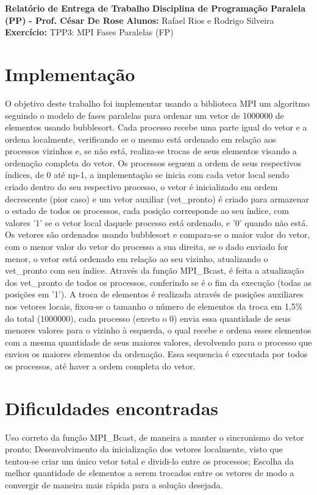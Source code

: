 \documentclass{article}
\begin{document}
\textbf{Relatório de Entrega de Trabalho} \newline
\textbf{Disciplina de Programação Paralela (PP)}\textbf{ - Prof. César De Rose} \newline
\textbf{Alunos:} Rafael Rios e Rodrigo Silveira \newline
\textbf{Exercício:} TPP3: MPI Fases Paralelas (FP)

\begin{multicols*}{2}

\section{Implementação}
O objetivo deste trabalho foi implementar usando a biblioteca MPI um algoritmo seguindo o modelo de fases paralelas para ordenar um vetor de 1000000 de elementos usando bubblesort. Cada processo recebe uma parte igual do vetor e a ordena localmente, verificando se o mesmo está ordenado em relação aos processos vizinhos e, se não está, realiza-se trocas de seus elementos visando a ordenação completa do vetor. Os processos seguem a ordem de seus respectivos índices, de 0 até np-1, a implementação se inicia com cada vetor local sendo criado dentro do seu respectivo processo, o vetor é inicializado em ordem decrescente (pior caso) e um vetor auxiliar (vet\_pronto) é criado para armazenar o estado de todos os processos, cada posição corresponde ao seu índice, com valores '1' se o vetor local daquele processo está ordenado, e '0' quando não está. Os vetores são ordenados usando bubblesort e compara-se o maior valor do vetor, com o menor valor do vetor do processo a sua direita, se o dado enviado for menor, o vetor está ordenado em relação ao seu vizinho, atualizando o vet\_pronto com seu índice. Através da função MPI\_Bcast, é feita a atualização dos vet\_pronto de todos os processos, conferindo se é o fim da execução (todas as posições em '1'). A troca de elementos é realizada através de posições auxiliares nos vetores locais, fixou-se o tamanho o número de elementos da troca em 1,5\% do total (1000000), cada processo (exceto o 0) envia essa quantidade de seus menores valores para o vizinho à esquerda, o qual recebe e ordena esses elementos com a mesma quantidade de seus maiores valores, devolvendo para o processo que enviou os maiores elementos da ordenação. Essa sequencia é executada por todos os processos, até haver a ordem completa do vetor.
\section{Dificuldades encontradas}
Uso correto da função MPI\_Bcast, de maneira a manter o sincronismo do vetor pronto; Desenvolvimento da inicialização dos vetores localmente, visto que tentou-se criar um único vetor total e dividi-lo entre os processos; Escolha da melhor quantidade de elementos a serem trocados entre os vetores de modo a convergir de maneira mais rápida para a solução desejada.  

\end{multicols*}
\end{document}
